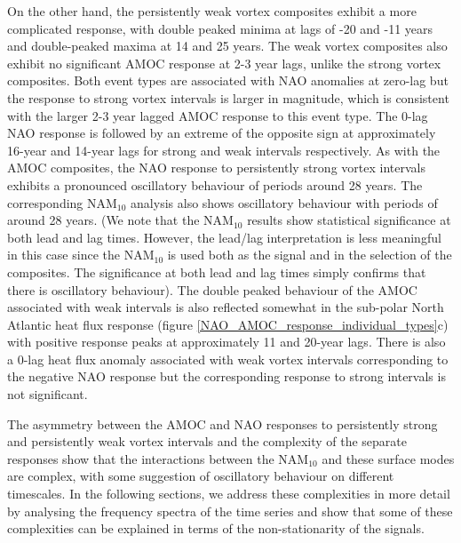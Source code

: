 \noindent On the other hand, the persistently weak vortex composites exhibit a more complicated response, with double peaked minima at lags of -20 and -11 years and double-peaked maxima at 14 and 25 years. The weak vortex composites also exhibit no significant AMOC response at 2-3 year lags, unlike the strong vortex composites. Both event types are associated with NAO anomalies at zero-lag but the response to strong vortex intervals is larger in magnitude, which is consistent with the larger 2-3 year lagged AMOC response to this event type. The 0-lag NAO response is followed by an extreme of the opposite sign at approximately 16-year and 14-year lags for strong and weak intervals respectively. As with the AMOC composites, the NAO response to persistently strong vortex intervals exhibits a pronounced oscillatory behaviour of periods around 28 years. The corresponding NAM$_{10}$ analysis also shows oscillatory behaviour with periods of around 28 years. (We note that the NAM$_{10}$ results  show statistical significance  at both lead and lag times. However, the lead/lag interpretation is less meaningful in this case since the NAM$_{10}$ is used both as the signal and in the selection of the composites. The significance at both lead and lag times simply confirms that there is oscillatory behaviour). The double peaked behaviour of the AMOC associated with weak intervals is also reflected somewhat in the sub-polar North Atlantic heat flux response (figure \ref{NAO_AMOC_response_individual_types}c) with positive response peaks at approximately 11 and 20-year lags. There is also a 0-lag heat flux anomaly associated with weak vortex intervals corresponding to the negative NAO response but the corresponding response to strong intervals is not significant. 

The asymmetry between the AMOC and NAO responses to persistently strong and persistently weak vortex intervals and the complexity of the separate responses show that the interactions between the NAM$_{10}$ and these surface modes are complex, with some suggestion of oscillatory behaviour on different timescales. In the following sections, we address these complexities in more detail by analysing the frequency spectra of the time series and show that some of these complexities can be explained in terms of the non-stationarity of the signals.

